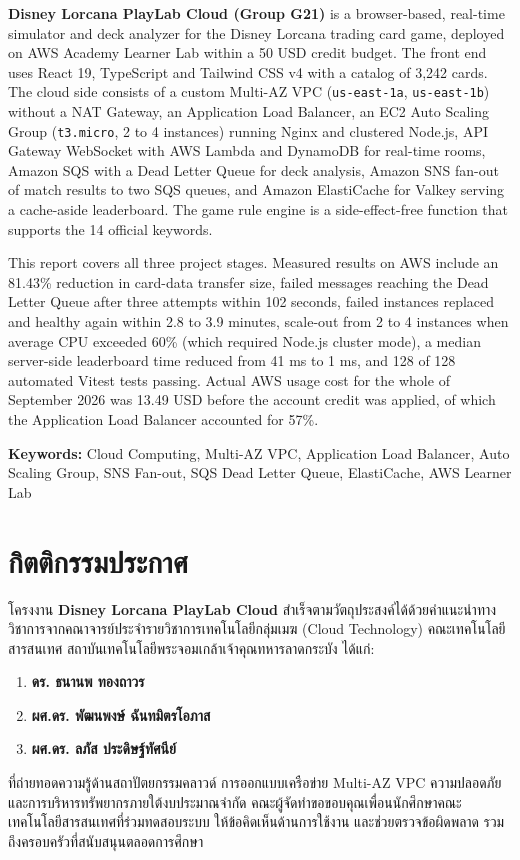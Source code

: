 \documentclass[12pt,a4paper]{report}
\begin{document}
\textbf{Disney Lorcana PlayLab Cloud (Group G21)} is a browser-based, real-time simulator and deck analyzer for the Disney Lorcana trading card game, deployed on AWS Academy Learner Lab within a 50 USD credit budget. The front end uses React 19, TypeScript and Tailwind CSS v4 with a catalog of 3,242 cards. The cloud side consists of a custom Multi-AZ VPC (\texttt{us-east-1a}, \texttt{us-east-1b}) without a NAT Gateway, an Application Load Balancer, an EC2 Auto Scaling Group (\texttt{t3.micro}, 2 to 4 instances) running Nginx and clustered Node.js, API Gateway WebSocket with AWS Lambda and DynamoDB for real-time rooms, Amazon SQS with a Dead Letter Queue for deck analysis, Amazon SNS fan-out of match results to two SQS queues, and Amazon ElastiCache for Valkey serving a cache-aside leaderboard. The game rule engine is a side-effect-free function that supports the 14 official keywords.

This report covers all three project stages. Measured results on AWS include an 81.43\% reduction in card-data transfer size, failed messages reaching the Dead Letter Queue after three attempts within 102 seconds, failed instances replaced and healthy again within 2.8 to 3.9 minutes, scale-out from 2 to 4 instances when average CPU exceeded 60\% (which required Node.js cluster mode), a median server-side leaderboard time reduced from 41 ms to 1 ms, and 128 of 128 automated Vitest tests passing. Actual AWS usage cost for the whole of September 2026 was 13.49 USD before the account credit was applied, of which the Application Load Balancer accounted for 57\%.

\vspace{0.6cm}
\noindent \textbf{Keywords:} Cloud Computing, Multi-AZ VPC, Application Load Balancer, Auto Scaling Group, SNS Fan-out, SQS Dead Letter Queue, ElastiCache, AWS Learner Lab

\newpage

\chapter*{กิตติกรรมประกาศ}

โครงงาน \textbf{Disney Lorcana PlayLab Cloud} สำเร็จตามวัตถุประสงค์ได้ด้วยคำแนะนำทางวิชาการจากคณาจารย์ประจำรายวิชาการเทคโนโลยีกลุ่มเมฆ (Cloud Technology) คณะเทคโนโลยีสารสนเทศ สถาบันเทคโนโลยีพระจอมเกล้าเจ้าคุณทหารลาดกระบัง ได้แก่:
\begin{enumerate}
    \item \textbf{ดร. ธนานพ ทองถาวร}
    \item \textbf{ผศ.ดร. พัฒนพงษ์ ฉันทมิตรโอภาส}
    \item \textbf{ผศ.ดร. ลภัส ประดิษฐ์ทัศนีย์}
\end{enumerate}
ที่ถ่ายทอดความรู้ด้านสถาปัตยกรรมคลาวด์ การออกแบบเครือข่าย Multi-AZ VPC ความปลอดภัย และการบริหารทรัพยากรภายใต้งบประมาณจำกัด คณะผู้จัดทำขอขอบคุณเพื่อนนักศึกษาคณะเทคโนโลยีสารสนเทศที่ร่วมทดสอบระบบ ให้ข้อคิดเห็นด้านการใช้งาน และช่วยตรวจข้อผิดพลาด รวมถึงครอบครัวที่สนับสนุนตลอดการศึกษา
\end{document}
